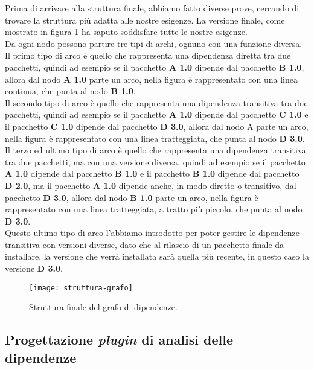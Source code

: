 Prima di arrivare alla struttura finale, abbiamo fatto diverse prove, cercando di trovare la struttura più adatta alle nostre esigenze.
La versione finale, come mostrato in figura \ref{fig:struttura-grafo} ha saputo soddisfare tutte le nostre esigenze.\\
Da ogni nodo possono partire tre tipi di archi, ognuno con una funzione diversa.
Il primo tipo di arco è quello che rappresenta 
una dipendenza diretta tra due pacchetti, quindi ad esempio se il pacchetto \textbf{A 1.0} dipende dal pacchetto \textbf{B 1.0}, 
allora dal nodo \textbf{A 1.0} parte un arco, nella figura è rappresentato con una linea continua, che punta al nodo \textbf{B 1.0}.\\
Il secondo tipo di arco è quello che rappresenta una dipendenza transitiva tra due pacchetti, quindi ad esempio se il pacchetto
\textbf{A 1.0} dipende dal pacchetto \textbf{C 1.0} e il pacchetto \textbf{C 1.0} dipende dal pacchetto \textbf{D 3.0},
allora dal nodo A parte un arco, nella figura è rappresentato con una linea tratteggiata, che punta al nodo \textbf{D 3.0}.\\
Il terzo ed ultimo tipo di arco è quello che rappresenta una dipendenza transitiva tra due pacchetti, ma con una versione diversa,
quindi ad esempio se il pacchetto \textbf{A 1.0} dipende dal pacchetto \textbf{B 1.0} e il pacchetto \textbf{B 1.0} dipende dal pacchetto 
\textbf{D 2.0}, ma il pacchetto \textbf{A 1.0} dipende anche, in modo diretto o transitivo, dal pacchetto \textbf{D 3.0}, 
allora dal nodo \textbf{B 1.0} parte un arco, nella figura è rappresentato con una linea tratteggiata, a tratto più piccolo, 
che punta al nodo \textbf{D 3.0}.\\
Questo ultimo tipo di arco l'abbiamo introdotto per poter gestire le dipendenze transitiva con versioni diverse, dato che al rilascio di un
pacchetto finale da installare, la versione che verrà installata sarà quella più recente, in questo caso la versione \textbf{D 3.0}.\\

\begin{figure}[!h] 
  \centering 
  \texttt{[image: struttura-grafo]} 
  \caption{Struttura finale del grafo di dipendenze.}
  \label{fig:struttura-grafo}
\end{figure}

\subsection*{Progettazione \textit{plugin} di analisi delle dipendenze}

